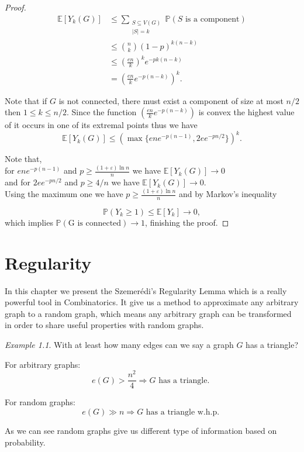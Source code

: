 \documentclass[12pt,twoside,a4paper,bibliography=totocnumbered]{book}
\numberwithin{equation}{section}
\let\log=\ln
\theoremstyle{remark}
\newtheorem{example}	[theorem] {Example}
\begin{document}
\begin{proof}
\begin{align*}
\mathbb{E}[Y_k (G)]  & \leq \sum_{\substack{S\subseteq V(G) \\ |S| = k}} \mathbb{P}(S\text{ is a component})\\
&\leq \binom{n}{k}(1-p)^{k(n-k)}\\
&\leq \left( \frac{en}{k} \right) ^k e^{-pk(n-k)}\\
& = \left( \frac{en}{k} e^{-p(n-k)} \right)^k.
\end{align*}

Note that if $G$ is not connected, there must exist a component of size at most $ n/2$ then $1 \leq k \leq n/2$. Since the function $\left( \frac{en}{k} e^{-p(n-k)} \right)$ is convex the highest value of it occurs in one of its extremal points thus we have
$$\mathbb{E}[Y_k (G)] \leq (\max\{ene^{-p(n-1)}, 2ee^{-pn/2}\})^k .$$

Note that, \\
for $ene^{-p(n-1)}$ and $p \geq \frac{(1 + \varepsilon) \log n}{n}$ we have $\mathbb{E}[Y_k (G)] \rightarrow 0$\\
and for $2ee^{-pn/2}$ and $p \geq 4/n$ we have $\mathbb{E}[Y_k (G)] \rightarrow 0$.\\

Using the maximum one we have $p \geq \frac{(1 + \varepsilon) \log n}{n}$  and by Markov's inequality

 $$\mathbb{P}(Y_k \geq 1) \leq \mathbb{E}[Y_k] \rightarrow 0,$$
 which implies $\mathbb{P}(\text{G is connected}) \rightarrow 1$, finishing the proof.

\end{proof}
\chapter{Regularity}
In this chapter we present the Szemerédi's Regularity Lemma which is a really powerful tool in Combinatorics. It give us a method to approximate any arbitrary graph to a random graph, which means any arbitrary graph can be transformed in order to share useful properties with random graphs.

\begin{example}
With at least how many edges can we say a graph $G$ has a triangle?

For arbitrary graphs:
$$ e(G) > \frac{n^2}{4} \Rightarrow G \text{ has a triangle. }$$

For random graphs:
$$ e(G) \gg n \Rightarrow G\text{ has a triangle w.h.p. } $$

As we can see random graphs give us different type of information based on probability.

\end{example}
\end{document}
